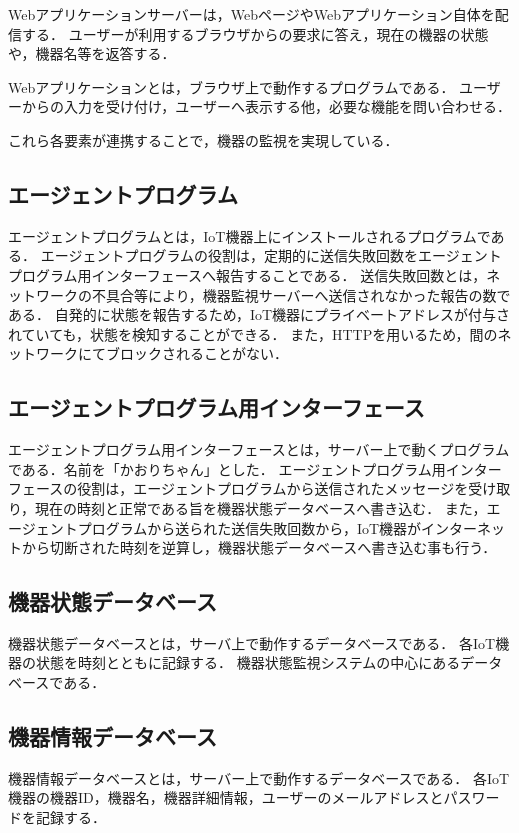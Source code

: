 Webアプリケーションサーバーは，WebページやWebアプリケーション自体を配信する．
ユーザーが利用するブラウザからの要求に答え，現在の機器の状態や，機器名等を返答する．
\medskip

Webアプリケーションとは，ブラウザ上で動作するプログラムである．
ユーザーからの入力を受け付け，ユーザーへ表示する他，必要な機能を問い合わせる．
\medskip

これら各要素が連携することで，機器の監視を実現している．

\subsection{エージェントプログラム}
エージェントプログラムとは，IoT機器上にインストールされるプログラムである．
エージェントプログラムの役割は，定期的に送信失敗回数をエージェントプログラム用インターフェースへ報告することである．
送信失敗回数とは，ネットワークの不具合等により，機器監視サーバーへ送信されなかった報告の数である．
自発的に状態を報告するため，IoT機器にプライベートアドレスが付与されていても，状態を検知することができる．
また，HTTPを用いるため，間のネットワークにてブロックされることがない．

\subsection{エージェントプログラム用インターフェース}
エージェントプログラム用インターフェースとは，サーバー上で動くプログラムである．名前を「かおりちゃん」とした．
エージェントプログラム用インターフェースの役割は，エージェントプログラムから送信されたメッセージを受け取り，現在の時刻と正常である旨を機器状態データベースへ書き込む．
また，エージェントプログラムから送られた送信失敗回数から，IoT機器がインターネットから切断された時刻を逆算し，機器状態データベースへ書き込む事も行う．

\subsection{機器状態データベース}
機器状態データベースとは，サーバ上で動作するデータベースである．
各IoT機器の状態を時刻とともに記録する．
機器状態監視システムの中心にあるデータベースである．

\subsection{機器情報データベース}
機器情報データベースとは，サーバー上で動作するデータベースである．
各IoT機器の機器ID，機器名，機器詳細情報，ユーザーのメールアドレスとパスワードを記録する．

